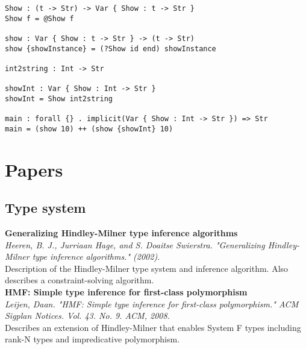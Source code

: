 \documentclass[12pt]{article}
\begin{document}
\begin{lstlisting}[caption=Implicits]
Show : (t -> Str) -> Var { Show : t -> Str }
Show f = @Show f

show : Var { Show : t -> Str } -> (t -> Str)
show {showInstance} = (?Show id end) showInstance

int2string : Int -> Str

showInt : Var { Show : Int -> Str }
showInt = Show int2string

main : forall {} . implicit(Var { Show : Int -> Str }) => Str
main = (show 10) ++ (show {showInt} 10)
\end{lstlisting}

\newpage
\section{Papers}

\subsection{Type system}
\textbf{Generalizing Hindley-Milner type inference algorithms} \\
\textit{Heeren, B. J., Jurriaan Hage, and S. Doaitse Swierstra. "Generalizing Hindley-Milner type inference algorithms." (2002).} \\
Description of the Hindley-Milner type system and inference algorithm. Also describes a constraint-solving algorithm.
\\
\textbf{HMF: Simple type inference for first-class polymorphism} \\
\textit{Leijen, Daan. "HMF: Simple type inference for first-class polymorphism." ACM Sigplan Notices. Vol. 43. No. 9. ACM, 2008.} \\
Describes an extension of Hindley-Milner that enables System F types including rank-N types and impredicative polymorphism.
\end{document}
